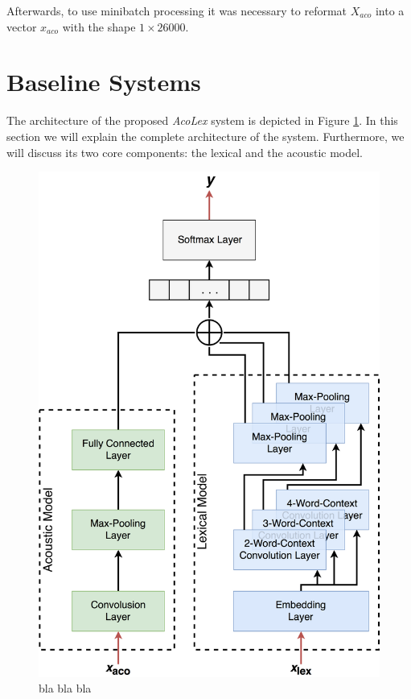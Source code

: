 \documentclass[11pt,a4paper]{article}
\begin{document}
	\noindent Afterwards, to use minibatch processing it was necessary to reformat $X_{aco}$ into a vector $x_{aco}$ with the shape $1 \times 26000$.
	
	
\section{Baseline Systems}
The architecture of the proposed \textit{AcoLex} system is depicted in Figure \ref{pic:sysArchitecture}. In this section we will explain the complete architecture of the system. Furthermore, we will discuss its two core components: the lexical and the acoustic model.

\begin{figure}[h]
	\centering
	\includegraphics[width=1\linewidth]{Bilder/acolex_CNN_paper.png}
	\caption{bla bla bla}
	\label{pic:sysArchitecture}
\end{figure}
\end{document}
